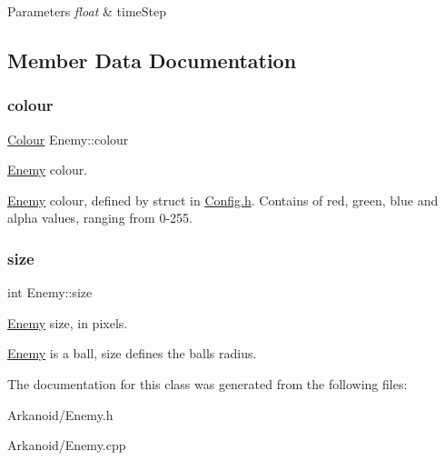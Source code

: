 \begin{DoxyParams}{Parameters}
{\em float} & time\+Step \\
\hline
\end{DoxyParams}


\subsection{Member Data Documentation}
\mbox{\label{class_enemy_a8fcd6954051e37e2ee89104e57145112}} 
\subsubsection{\texorpdfstring{colour}{colour}}
{\footnotesize\ttfamily \hyperlink{struct_colour}{Colour} Enemy\+::colour}



\hyperlink{class_enemy}{Enemy} colour. 

\hyperlink{class_enemy}{Enemy} colour, defined by struct in \hyperlink{_config_8h_source}{Config.\+h}. Contains of red, green, blue and alpha values, ranging from 0-\/255. \mbox{\label{class_enemy_aa8e17bc99723176548d71447e54cac73}} 
\subsubsection{\texorpdfstring{size}{size}}
{\footnotesize\ttfamily int Enemy\+::size}



\hyperlink{class_enemy}{Enemy} size, in pixels. 

\hyperlink{class_enemy}{Enemy} is a ball, size defines the ball\textquotesingle{}s radius. 

The documentation for this class was generated from the following files\+:\begin{DoxyCompactItemize}
\item 
Arkanoid/Enemy.\+h\item 
Arkanoid/Enemy.\+cpp\end{DoxyCompactItemize}

